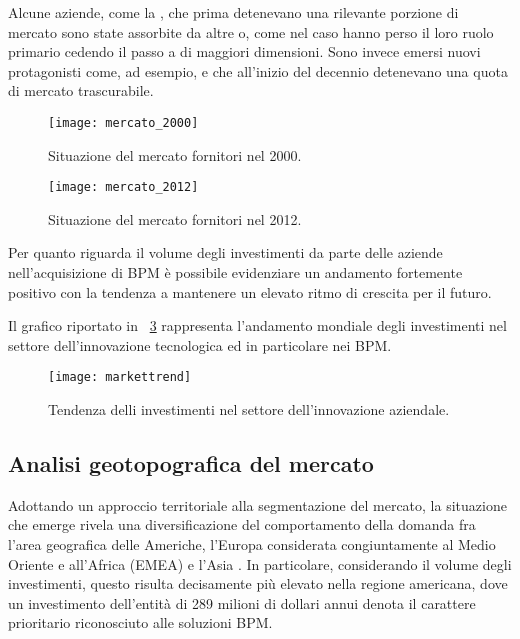 Alcune aziende, come la , che prima detenevano una rilevante porzione di mercato sono state assorbite da altre o, come nel caso  hanno perso il loro ruolo primario cedendo il passo a  di maggiori dimensioni. Sono invece emersi nuovi protagonisti come, ad esempio,   e  che all'inizio del decennio detenevano una quota di mercato trascurabile.

\begin{figure}[H]
  \centering
  \texttt{[image: mercato\_2000]}
  \caption{Situazione del mercato fornitori nel 2000.}
  \label{fig:mercato2000}
\end{figure}

\begin{figure}[H]
  \centering
  \texttt{[image: mercato\_2012]}
  \caption{Situazione del mercato fornitori nel 2012.}
  \label{fig:mercato2012}
\end{figure}

Per quanto riguarda il volume degli investimenti da parte delle aziende nell'acquisizione di \sw BPM è possibile evidenziare un andamento fortemente positivo con la tendenza a mantenere un elevato ritmo di crescita per il futuro.

Il grafico riportato in \figurename~\ref{fig:trend} rappresenta l'andamento mondiale degli investimenti nel settore dell'innovazione tecnologica ed in particolare nei \sw BPM.

\begin{figure}[H]
  \centering
  \texttt{[image: markettrend]}
  \caption{Tendenza delli investimenti nel settore dell'innovazione aziendale.}
  \label{fig:trend}
\end{figure}

\subsection{Analisi geotopografica del mercato}%
Adottando un approccio territoriale alla segmentazione del mercato, la situazione che emerge rivela una diversificazione del comportamento della domanda fra l'area geografica delle Americhe, l'Europa considerata congiuntamente al Medio Oriente e all'Africa (EMEA) e l'Asia \cite{bea:bpm}. In particolare, considerando il volume degli investimenti, questo risulta decisamente più elevato nella regione americana, dove un investimento dell'entità di 289 milioni di dollari annui denota il carattere prioritario riconosciuto alle soluzioni BPM\@.

